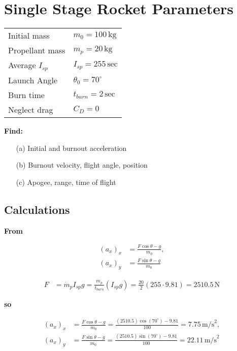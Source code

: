 \documentclass{article}
\begin{document}
\section*{Single Stage Rocket Parameters}

\begin{tabular}{ll}
    Initial mass & $m_0 = 100 \, \text{kg}$ \\
    Propellant mass & $m_p = 20 \, \text{kg}$ \\
    Average $I_{sp}$ & $I_{sp} = 255 \, \text{sec}$ \\
    Launch Angle & $\theta_0 = 70^\circ$ \\
    Burn time & $t_{burn} = 2 \, \text{sec}$ \\
    Neglect drag & $C_D = 0$
\end{tabular}

\textbf{Find:}

\begin{itemize}
    \item[(a)] Initial and burnout acceleration
    \item[(b)] Burnout velocity, flight angle, position
    \item[(c)] Apogee, range, time of flight
\end{itemize}

\subsection*{Calculations}

\textbf{From}

\[
\begin{aligned}
    (a_x)_x &= \frac{F\cos\theta - g}{m_0}, \\
    (a_x)_y &= \frac{F\sin\theta - g}{m_0}
\end{aligned}
\]

\[
\begin{aligned}
    F &= \dot{m}_p I_{sp} g = \frac{m_p}{t_{burn}} (I_{sp} g) = \frac{20}{2} (255 \cdot 9.81) = 2510.5 \, \text{N}
\end{aligned}
\]

\textbf{so}

\[
\begin{aligned}
    (a_x)_x &= \frac{F\cos\theta - g}{m_0} = \frac{(2510.5)\cos(70^\circ) - 9.81}{100} = 7.75 \, \text{m/s}^2, \\
    (a_x)_y &= \frac{F\sin\theta - g}{m_0} = \frac{(2510.5)\sin(70^\circ) - 9.81}{100} = 22.11 \, \text{m/s}^2
\end{aligned}
\]
\end{document}

